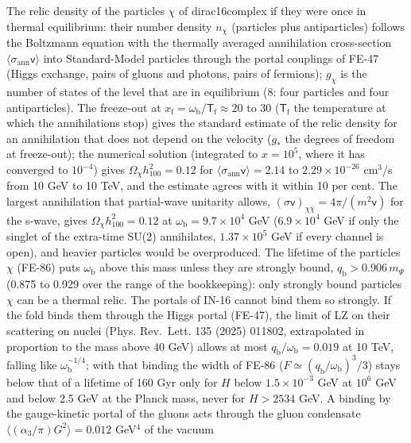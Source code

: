 \documentclass[
  10pt,
]{article}
\begin{document}
The relic density of the particles \(\chi\) of dirac16complex if they
were once in thermal equilibrium: their number density \(n_\chi\)
(particles plus antiparticles) follows the Boltzmann equation with the
thermally averaged annihilation cross-section
\(\langle\sigma_{\mathrm{ann}}\mathsf{v}\rangle\) into Standard-Model
particles through the portal couplings of FE-47 (Higgs exchange, pairs
of gluons and photons, pairs of fermions); \(g_\chi\) is the number of
states of the level that are in equilibrium (8: four particles and four
antiparticles). The freeze-out at
\(x_{\mathrm{f}} = \omega_{\mathrm{b}}/\mathsf{T}_{\mathrm{f}} \approx 20\)
to 30 (\(\mathsf{T}_{\mathrm{f}}\) the temperature at which the
annihilations stop) gives the standard estimate of the relic density for
an annihilation that does not depend on the velocity (\(g_*\) the
degrees of freedom at freeze-out); the numerical solution (integrated to
\(x = 10^5\), where it has converged to \(10^{-4}\)) gives
\(\Omega_\chi h_{100}^2 = 0.12\) for
\(\langle\sigma_{\mathrm{ann}}\mathsf{v}\rangle = 2.14\) to
\(2.29\times10^{-26}\) cm\(^3\)/s from 10 GeV to 10 TeV, and the
estimate agrees with it within 10 per cent. The largest annihilation
that partial-wave unitarity allows,
\((\sigma\mathsf{v})_{\chi\bar\chi} = 4\pi/(m^2\mathsf{v})\) for the
s-wave, gives \(\Omega_\chi h_{100}^2 = 0.12\) at
\(\omega_{\mathrm{b}} = 9.7\times10^4\) GeV (\(6.9\times10^4\) GeV if
only the singlet of the extra-time SU(2) annihilates, \(1.37\times10^5\)
GeV if every channel is open), and heavier particles would be
overproduced. The lifetime of the particles \(\chi\) (FE-86) puts
\(\omega_{\mathrm{b}}\) above this mass unless they are strongly bound,
\(q_{\mathrm{b}} > 0.906\,m_\Psi\) (0.875 to 0.929 over the range of the
bookkeeping): only strongly bound particles \(\chi\) can be a thermal
relic. The portals of IN-16 cannot bind them so strongly. If the fold
binds them through the Higgs portal (FE-47), the limit of LZ on their
scattering on nuclei (Phys. Rev.~Lett. 135 (2025) 011802, extrapolated
in proportion to the mass above 40 GeV) allows at most
\(q_{\mathrm{b}}/\omega_{\mathrm{b}} = 0.019\) at 10 TeV, falling like
\(\omega_{\mathrm{b}}^{-1/4}\); with that binding the width of FE-86
(\(F \simeq (q_{\mathrm{b}}/\omega_{\mathrm{b}})^3/3\)) stays below that
of a lifetime of 160 Gyr only for \(H\) below \(1.5\times10^{-3}\) GeV
at \(10^6\) GeV and below 2.5 GeV at the Planck mass, never for
\(H > 2534\) GeV. A binding by the gauge-kinetic portal of the gluons
acts through the gluon condensate
\(\langle(\alpha_3/\pi)G^2\rangle = 0.012\) GeV\(^4\) of the vacuum
\end{document}

